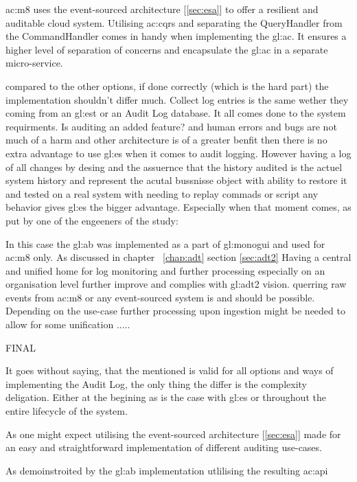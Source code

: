 \Gls{ac:m8} uses the event-sourced architecture [\ref{sec:esa}] to offer a resilient and auditable cloud system. Utilising \gls{ac:cqrs} and separating the QueryHandler from the CommandHandler comes in handy when implementing the \gls{gl:ac}. It ensures a higher level of separation of concerns and encapsulate the \gls{gl:ac} in a separate micro-service.

compared to the other options, if done correctly (which is the hard part) the implementation shouldn't differ much. Collect log entries is the same wether they coming from an \gls{gl:est} or an Audit Log database. It all comes done to the system requirments. Is auditing an added feature? and human errors and bugs are not much of a harm and other architecture is of a greater benfit then there is no extra advantage to use \gls{gl:es} when it comes to audit logging. However having a log of all changes by desing and the assuernce that the history audited is the actuel system history and represent the acutal bussnisse object with ability to restore it and tested on a real system with needing to replay commads or script any behavior gives \gls{gl:es} the bigger advantage. Especially when that moment comes, as put by one of the engeeners of the study:

In this case the \gls{gl:ab} was implemented as a part of \gls{gl:monogui} and used for \gls{ac:m8} only. As discussed in chapter ~\ref{chap:adt} section \ref{sec:adt2} Having a central and unified home for log monitoring and further processing especially on an organisation level further improve and complies with \gls{gl:adt2} vision. querring raw events from \gls{ac:m8} or any event-sourced system is and should be possible. Depending on the use-case further processing upon ingestion might be needed to allow for some unification .....

FINAL

It goes without saying, that the mentioned is valid for all options and ways of implementing the Audit Log, the only thing the differ is the complexity deligation. Either at the begining as is the case with \gls{gl:es} or throughout the entire lifecycle of the system.

As one might expect utilising the event-sourced architecture [\ref{sec:esa}] made for an easy and straightforward implementation of different auditing use-cases. 


As demoinstroited by the \gls{gl:ab} implementation utlilising the resulting \gls{ac:api}




